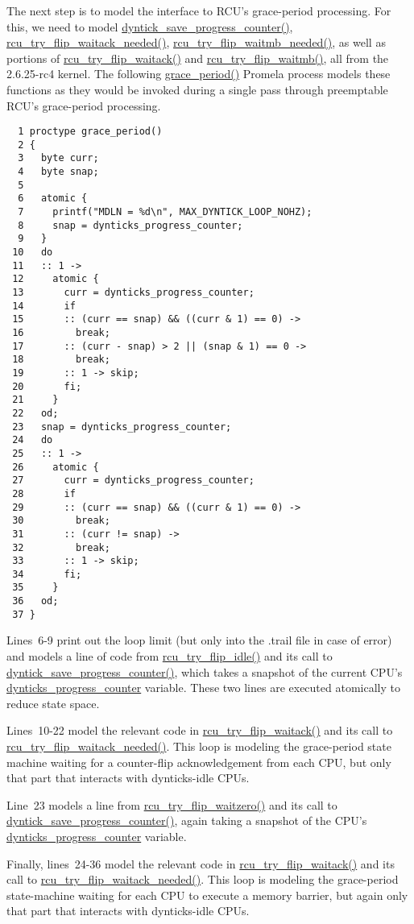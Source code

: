 The next step is to model the interface to RCU's grace-period
processing.
For this, we need to model
\url{dyntick_save_progress_counter()},
\url{rcu_try_flip_waitack_needed()},
\url{rcu_try_flip_waitmb_needed()},
as well as portions of
\url{rcu_try_flip_waitack()} and
\url{rcu_try_flip_waitmb()}, all from the 2.6.25-rc4 kernel.
The following \url{grace_period()} Promela process models
these functions as they would be invoked during a single pass
through preemptable RCU's grace-period processing.

{ \scriptsize
\begin{verbatim}
  1 proctype grace_period()
  2 {
  3   byte curr;
  4   byte snap;
  5 
  6   atomic {
  7     printf("MDLN = %d\n", MAX_DYNTICK_LOOP_NOHZ);
  8     snap = dynticks_progress_counter;
  9   }
 10   do
 11   :: 1 ->
 12     atomic {
 13       curr = dynticks_progress_counter;
 14       if
 15       :: (curr == snap) && ((curr & 1) == 0) ->
 16         break;
 17       :: (curr - snap) > 2 || (snap & 1) == 0 ->
 18         break;
 19       :: 1 -> skip;
 20       fi;
 21     }
 22   od;
 23   snap = dynticks_progress_counter;
 24   do
 25   :: 1 ->
 26     atomic {
 27       curr = dynticks_progress_counter;
 28       if
 29       :: (curr == snap) && ((curr & 1) == 0) ->
 30         break;
 31       :: (curr != snap) ->
 32         break;
 33       :: 1 -> skip;
 34       fi;
 35     }
 36   od;
 37 }
\end{verbatim}
}

Lines~6-9 print out the loop limit (but only into the .trail file
in case of error) and models a line of code
from \url{rcu_try_flip_idle()} and its call to
\url{dyntick_save_progress_counter()}, which takes a
snapshot of the current CPU's \url{dynticks_progress_counter}
variable.
These two lines are executed atomically to reduce state space.

Lines~10-22 model the relevant code in
\url{rcu_try_flip_waitack()} and its call to
\url{rcu_try_flip_waitack_needed()}.
This loop is modeling the grace-period state machine waiting for
a counter-flip acknowledgement from each CPU, but only that part
that interacts with dynticks-idle CPUs.

Line~23 models a line from \url{rcu_try_flip_waitzero()}
and its call to \url{dyntick_save_progress_counter()}, again
taking a snapshot of the CPU's \url{dynticks_progress_counter}
variable.

Finally, lines~24-36 model the relevant code in
\url{rcu_try_flip_waitack()} and its call to
\url{rcu_try_flip_waitack_needed()}.
This loop is modeling the grace-period state-machine waiting for
each CPU to execute a memory barrier, but again only that part
that interacts with dynticks-idle CPUs.

